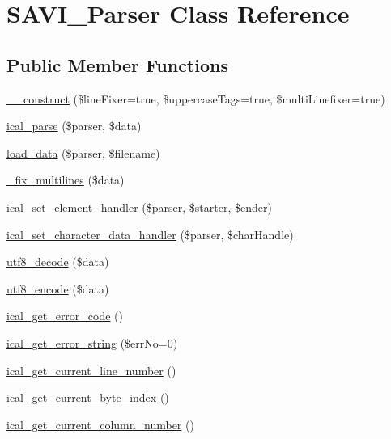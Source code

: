 \hypertarget{classSAVI__Parser}{
\section{SAVI\_\-Parser Class Reference}
\label{classSAVI__Parser}
}
\subsection*{Public Member Functions}
\begin{DoxyCompactItemize}
\item 
\hyperlink{classSAVI__Parser_a242c7fe86fb7c62f11f9212afbfa6112}{\_\-\_\-construct} (\$lineFixer=true, \$uppercaseTags=true, \$multiLinefixer=true)
\item 
\hyperlink{classSAVI__Parser_a26a305bbf09bf4742f1da2262f6c5ae2}{ical\_\-parse} (\$parser, \$data)
\item 
\hyperlink{classSAVI__Parser_a866029e3a4a8f04843dc6735368ec3e7}{load\_\-data} (\$parser, \$filename)
\item 
\hyperlink{classSAVI__Parser_aff34336fb5f79c52c0a06ac3c5a50291}{\_\-fix\_\-multilines} (\$data)
\item 
\hyperlink{classSAVI__Parser_af5040d51f1be467234b13837eefc9d53}{ical\_\-set\_\-element\_\-handler} (\$parser, \$starter, \$ender)
\item 
\hyperlink{classSAVI__Parser_a9167bc8a37cf9e9766b1f82f5784cdaf}{ical\_\-set\_\-character\_\-data\_\-handler} (\$parser, \$charHandle)
\item 
\hyperlink{classSAVI__Parser_a0af36ab5229619c8c396d454c8c89116}{utf8\_\-decode} (\$data)
\item 
\hyperlink{classSAVI__Parser_a9e9a4aca94f8a18a6fbc1dbc27ba594b}{utf8\_\-encode} (\$data)
\item 
\hyperlink{classSAVI__Parser_abbb9a24b226831f7ebf5d27b9754b69e}{ical\_\-get\_\-error\_\-code} ()
\item 
\hyperlink{classSAVI__Parser_a77d83b11f08a322cae57654f43ed0b22}{ical\_\-get\_\-error\_\-string} (\$errNo=0)
\item 
\hyperlink{classSAVI__Parser_a099de2f0a6cf07f9433080fb3a38556d}{ical\_\-get\_\-current\_\-line\_\-number} ()
\item 
\hyperlink{classSAVI__Parser_a7dd9766590f266ab55bd78d7e9ac2963}{ical\_\-get\_\-current\_\-byte\_\-index} ()
\item 
\hyperlink{classSAVI__Parser_a88fdf5a60b67329b81255715822af3a5}{ical\_\-get\_\-current\_\-column\_\-number} ()
\end{DoxyCompactItemize}
